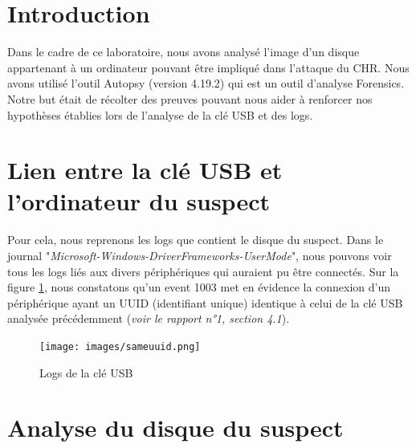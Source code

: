 \documentclass[a4paper]{article}
\begin{document}
\let\cleardoublepage\clearpage










\tableofcontents \newpage










\section{Introduction}

Dans le cadre de ce laboratoire, nous avons analysé l'image d'un disque appartenant à un ordinateur pouvant être impliqué dans l'attaque du CHR. Nous avons utilisé l'outil Autopsy (version 4.19.2) qui est un outil d'analyse Forensics. Notre but était de récolter des preuves pouvant nous aider à renforcer nos hypothèses établies lors de l'analyse de la clé USB et des logs.








\section{Lien entre la clé USB et l'ordinateur du suspect}

Pour cela, nous reprenons les logs que contient le disque du suspect. Dans le journal "\emph{Microsoft-Windows-DriverFrameworks-UserMode}", nous pouvons voir tous les logs liés aux divers périphériques qui auraient pu être connectés. Sur la figure \ref{fig:sameuuid}, nous constatons qu'un event 1003 met en évidence la connexion d'un périphérique ayant un UUID (identifiant unique) identique à celui de la clé USB analysée précédemment (\emph{voir le rapport n°1, section 4.1}).

\begin{figure}[H]
    \centering
    \texttt{[image: images/sameuuid.png]}
    \caption{Logs de la clé USB}
    \label{fig:sameuuid}
\end{figure}







\newpage
\section{Analyse du disque du suspect}
\end{document}

